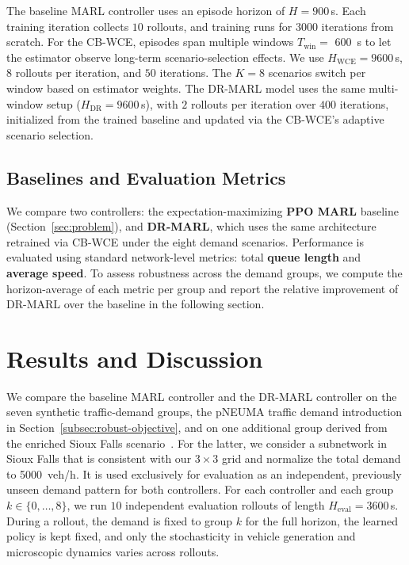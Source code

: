 \documentclass{ifacconf}
\newcommand{\1}{\mbox{1}\hspace{-0.25em}\mbox{l}}
\begin{document}
The baseline MARL controller uses an episode horizon of $H = 900$\,s. Each training iteration collects $10$ rollouts, and training runs for $3000$ iterations from scratch. 
For the CB-WCE, episodes span multiple windows  $T_{\mathrm{win}} =$ \SI{600}{\second} to let the estimator observe long-term scenario-selection effects. We use $H_{\text{WCE}} = 9600$\,s, $8$ rollouts per iteration, and $50$ iterations. The $K=8$ scenarios switch per window based on estimator weights. 
The DR-MARL model uses the same multi-window setup ($H_{\text{DR}}= 9600$\,s), with $2$ rollouts per iteration over $400$ iterations, initialized from the trained baseline and updated via the CB-WCE's adaptive scenario selection.

\subsection{Baselines and Evaluation Metrics}
\label{subsec:baseline_eval}
We compare two controllers: the expectation-maximizing \textbf{PPO MARL} baseline (Section~\ref{sec:problem}), and \textbf{DR-MARL}, which uses the same architecture retrained via CB-WCE under the eight demand scenarios. Performance is evaluated using standard network-level metrics: total \textbf{queue length} and \textbf{average speed}. To assess robustness across the demand groups, we compute the horizon-average of each metric per group and report the relative improvement of DR-MARL over the baseline in the following section.




\section{Results and Discussion}



We compare the baseline MARL controller and the DR-MARL controller on the seven synthetic traffic-demand groups, the pNEUMA traffic demand introduction in Section~\ref{subsec:robust-objective}, and on one additional group derived from the enriched Sioux Falls scenario~\citep{chakirov2014enriched}. For the latter, we consider a subnetwork in Sioux Falls that is consistent with our $3\times3 $ grid and normalize the total demand to \SI{5000}{veh/h}. It is used exclusively for evaluation as an independent, previously unseen demand pattern for both controllers. For each controller and each group $k\in\{0,\dots,8\}$, we run $10$ independent evaluation rollouts of length $H_{\mathrm{eval}} = 3600$\,s. During a rollout, the demand is fixed to group $k$ for the full horizon, the learned policy is kept fixed, and only the stochasticity in vehicle generation and microscopic dynamics varies across rollouts. 
\end{document}
